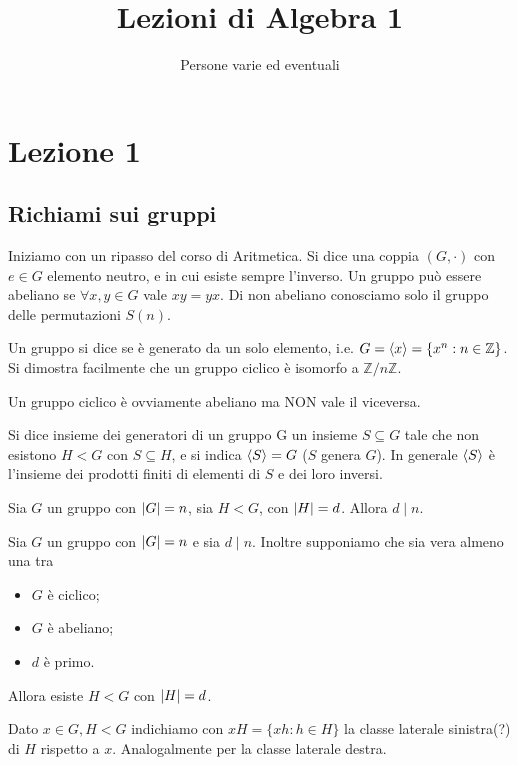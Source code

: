 \documentclass[a4paper,10pt,oneside]{math_article}
\title{Lezioni di Algebra 1}
\author{Persone varie ed eventuali}
\date{}
\begin{document}
\maketitle

\cleardoublepage	
  \section{Lezione 1}
    \subsection{Richiami sui gruppi}
      Iniziamo con un ripasso del corso di Aritmetica. Si dice  una coppia $(G,\cdot)$ con $e \in G$ elemento neutro, e in cui esiste sempre l'inverso. Un gruppo può essere abeliano se $\forall x,y\in G$ vale $xy=yx$. Di non abeliano conosciamo solo il gruppo delle permutazioni $S(n)$.
      
      Un gruppo si dice  se è generato da un solo elemento, i.e. $G = \left\langle x\right\rangle = \{x^n: n\in \mathbb Z\}$. Si dimostra facilmente che un gruppo ciclico è isomorfo a $\mathbb Z/n\mathbb Z$.
      
      Un gruppo ciclico è ovviamente abeliano ma NON vale il viceversa.
      
      Si dice insieme dei generatori di un gruppo G un insieme $S\subseteq G$ tale che non esistono $H<G$ con $S\subseteq H$, e si indica $\left\langle S\right\rangle =G$ ($S$ genera $G$). In generale $\left\langle S\right\rangle$ è l'insieme dei prodotti finiti di elementi di $S$ e dei loro inversi.
      
      \begin{mytheorem}
	Sia $G$ un gruppo con $\left|G\right| = n$, sia $H<G$, con $\left|H\right| = d$. Allora $d\mid n$.
      \end{mytheorem}
      
      \begin{mytheorem}
	Sia $G$ un gruppo con $\left|G\right| = n$ e sia $d\mid n$. Inoltre supponiamo che sia vera almeno una tra
	\begin{itemize}
	  \item $G$ è ciclico;
	  \item $G$ è abeliano;
	  \item $d$ è primo.
	\end{itemize}
	
	Allora esiste $H<G$ con $\left|H\right|=d$.
      \end{mytheorem}
      
      Dato $x\in G, H<G$ indichiamo con $xH=\{xh: h \in H\}$ la classe laterale sinistra(?) di $H$ rispetto a $x$. Analogalmente per la classe laterale destra. 
      
\end{document}
